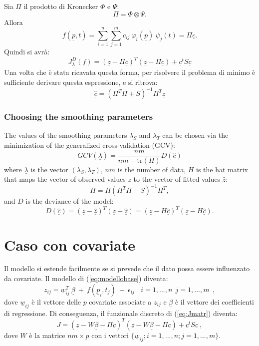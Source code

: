 \documentclass[a4paper,11pt,twoside,openright]{book}							%
\begin{document}
Sia $\Pi$ il prodotto di Kronecker $\Phi$ e $\Psi$:
$$ \Pi = \Phi \otimes \Psi .$$
Allora
$$
f(\underline p,t)=\sum_{i=1}^n \sum_{j=1}^m c_{ij}\ \varphi_i(\underline p)\ \psi_j(t) = \Pi \underline c .
$$
Quindi si avrà:
\begin{equation} 
\label{eq:Jmatr}
J_{\underline \lambda }^D(f) = (\underline z - \Pi \underline c)^T (\underline z - \Pi \underline c) + \underline c^t S \underline c 
\end{equation}
Una volta che è stata ricavata questa forma, per risolvere il problema di minimo è sufficiente derivare questa espressione, e si ritrova:
$$ \hat  {\underline c} = (\Pi^T \Pi + S)^{-1}\Pi^T \underline z$$



\subsubsection*{Choosing the smoothing parameters}

The values of the smoothing parameters $\lambda_S$ and $\lambda_T$ can be chosen via the minimization of the generalized cross-validation (GCV):
$$ GCV(\underline \lambda) =\frac{nm}{nm-\text{tr}(H)}  D(\hat  {\underline c}) $$
where $\underline \lambda$ is the vector $ (\lambda_S,\lambda_T) $, $nm$ is the number of data, $H$ is the hat matrix that maps the vector of observed values $\underline z$ to the vector of fitted values $\hat  {\underline z}$:
$$ H = \Pi (\Pi^T \Pi + S)^{-1}\Pi^T ,$$
and $D$ is the deviance of the model:
$$  D(\hat  {\underline c}) = (\underline z - \hat  {\underline z})^T(\underline z - \hat  {\underline z}) = (\underline z - H \hat  {\underline c})^T(\underline z - H \hat  {\underline c}).$$


\section{Caso con covariate}

Il modello si estende facilmente se si prevede che il dato possa essere influenzato da covariate. Il modello di (\ref{eq:modellobase}) diventa:
$$ z_{ij}= \underline w_{ij}^T\  \underline \beta   \ + \  f(\underline p_i,t_j)\ +\ \epsilon_{ij}\ \ \ \ i = 1,...,n\ \ j=1,...,m \ \ ,$$
dove $\underline w_{ij}$ è il vettore delle $p$ covariate associate a $z_{ij}$ e $\underline \beta$ è il vettore dei coefficienti di regressione. Di conseguenza, il funzionale discreto di (\ref{eq:Jmatr}) diventa:
$$ J = (\underline z - W \underline \beta - \Pi \underline c)^T (\underline z - W \underline \beta - \Pi \underline c) + \underline c^t S \underline c  \ ,$$
dove $W$ è la matrice $nm \times p$ con i vettori $ \{\underline w_{ij}; i=1,...,n;j=1,...,m\}$.
\end{document}
